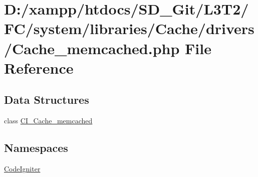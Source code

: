 \hypertarget{system_2libraries_2_cache_2drivers_2_cache__memcached_8php}{}\section{D\+:/xampp/htdocs/\+S\+D\+\_\+\+Git/\+L3\+T2/\+F\+C/system/libraries/\+Cache/drivers/\+Cache\+\_\+memcached.php File Reference}
\label{system_2libraries_2_cache_2drivers_2_cache__memcached_8php}
\subsection*{Data Structures}
\begin{DoxyCompactItemize}
\item 
class \hyperlink{class_c_i___cache__memcached}{C\+I\+\_\+\+Cache\+\_\+memcached}
\end{DoxyCompactItemize}
\subsection*{Namespaces}
\begin{DoxyCompactItemize}
\item 
 \hyperlink{namespace_code_igniter}{Code\+Igniter}
\end{DoxyCompactItemize}
